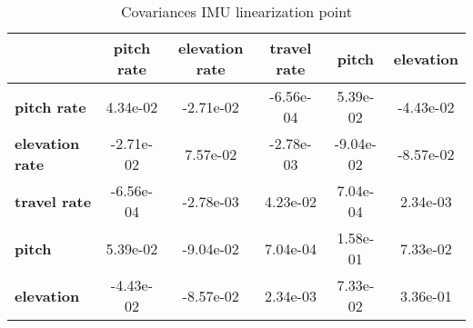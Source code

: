 \begin{table}[h!]
\centering
\begin{tiny}\begin{tabular}{|l|c|c|c|c|c|}
\hline
&\textbf{pitch rate}&\textbf{elevation rate}&\textbf{travel rate}&\textbf{pitch}&\textbf{elevation}\\\hline
\textbf{pitch rate}&4.34e-02&-2.71e-02&-6.56e-04&5.39e-02&-4.43e-02\\\hline
\textbf{elevation rate}&-2.71e-02&7.57e-02&-2.78e-03&-9.04e-02&-8.57e-02\\\hline
\textbf{travel rate}&-6.56e-04&-2.78e-03&4.23e-02&7.04e-04&2.34e-03\\\hline
\textbf{pitch}&5.39e-02&-9.04e-02&7.04e-04&1.58e-01&7.33e-02\\\hline
\textbf{elevation}&-4.43e-02&-8.57e-02&2.34e-03&7.33e-02&3.36e-01\\\hline
\end{tabular}
\end{tiny}
\caption{Covariances IMU linearization point}
\label{table:V_I_lin}
\end{table}